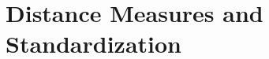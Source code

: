 \documentclass[a4paper,12pt]{report}
\begin{document}
	
	
	
	
	\tableofcontents
	\newpage
	

 \chapter{Distance Measures and Standardization}
%
%
\end{document}
